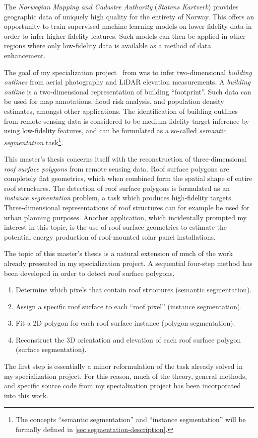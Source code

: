 The \textit{Norwegian Mapping and Cadastre Authority} (\textit{Statens Kartverk}) provides geographic data of uniquely high quality for the entirety of Norway.
This offers an opportunity to train supervised machine learning models on lower fidelity data in order to infer higher fidelity features.
Such models can then be applied in other regions where only low-fidelity data is available as a method of data enhancement.

The goal of my specialization project~\cite{specialization-project} from  was to infer two-\linebreak{}dimensional \textit{building outlines} from aerial photography and LiDAR elevation measurements.
A \textit{building outline} is a two-dimensional representation of building \enquote{footprint}.
Such data can be used for map annotations, flood risk analysis, and population density estimates, amongst other applications.
The identification of building outlines from remote sensing data is considered to be medium-fidelity target inference by using low-fidelity features, and can be formulated as a so-called \textit{semantic segmentation} task\footnote{The concepts \enquote{semantic segmentation} and \enquote{instance segmentation} will be formally defined in \cref{sec:segmentation-description}.}.

This master's thesis concerns itself with the reconstruction of three-dimensional \textit{roof surface polygons} from remote sensing data.
Roof surface polygons are completely flat geometries, which when combined form the spatial shape of entire roof structures.
The detection of roof surface polygons is formulated as an \textit{instance segmentation} problem, a task which produces high-fidelity targets.
Three-dimensional representations of roof structures can for example be used for urban planning purposes.
Another application, which incidentally prompted my interest in this topic, is the use of roof surface geometries to estimate the potential energy production of roof-mounted solar panel installations.

The topic of this master's thesis is a natural extension of much of the work already presented in my specialization project.
A sequential four-step method has been developed in order to detect roof surface polygons,
\begin{enumerate}[noitemsep]
  \item Determine which pixels that contain roof structures (semantic segmentation).
  \item Assign a specific roof surface to each \enquote{roof pixel} (instance segmentation).
  \item Fit a 2D polygon for each roof surface instance (polygon segmentation).
  \item Reconstruct the 3D orientation and elevation of each roof surface polygon (surface segmentation).
\end{enumerate}
The first step is essentially a minor reformulation of the task already solved in my specialization project.
For this reason, much of the theory, general methods, and specific source code from my specialization project has been incorporated into this work.

